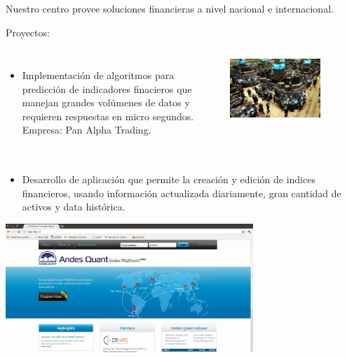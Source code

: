 \frame
{
\frametitle{}

Nuestro centro provee soluciones financieras a nivel nacional e internacional.

Proyectos:


\begin{columns}
\begin{itemize}
\item Implementación de algoritmos para predicción de indicadores finacieros que manejan grandes volúmenes de datos y requieren respuestas en micro segundos. Empresa: Pan Alpha Trading.
\end{itemize}
\includegraphics[width=0.7\textwidth]{img/wallstreet}
\end{columns}

}

\frame
{
\frametitle{}

\begin{itemize}
\item Desarrollo de aplicación que permite la creación y edición de indices financieros, usando información actualizada diariamente, gran cantidad de activos y data histórica.
\end{itemize}
\begin{center}
 \includegraphics[width=0.7\textwidth]{img/ETF}
\end{center}





}

